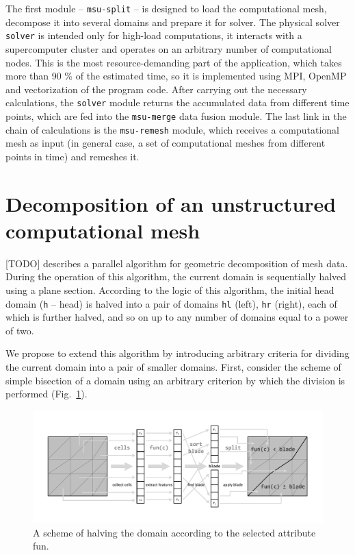 \documentclass[
11pt,%
tightenlines,%
twoside,%
onecolumn,%
nofloats,%
nobibnotes,%
nofootinbib,%
superscriptaddress,%
noshowpacs,%
centertags]%
{revtex4}
\begin{document}
The first module -- \texttt{msu-split} -- is designed to load the computational mesh, decompose it into several domains and prepare it for solver.
The physical solver \texttt{solver} is intended only for high-load computations, it interacts with a supercomputer cluster and operates on an arbitrary number of computational nodes.
This is the most resource-demanding part of the application, which takes more than 90 \% of the estimated time, so it is implemented using MPI, OpenMP and vectorization of the program code.
After carrying out the necessary calculations, the \texttt{solver} module returns the accumulated data from different time points, which are fed into the \texttt{msu-merge} data fusion module.
The last link in the chain of calculations is the \texttt{msu-remesh} module, which receives a computational mesh as input (in general case, a set of computational meshes from different points in time) and remeshes it.

\section{Decomposition of an unstructured computational mesh}

[TODO] describes a parallel algorithm for geometric decomposition of mesh data.
During the operation of this algorithm, the current domain is sequentially halved using a plane section.
According to the logic of this algorithm, the initial head domain (\texttt{h} -- head) is halved into a pair of domains \texttt{hl} (left), \texttt{hr} (right), each of which is further halved, and so on up to any number of domains equal to a power of two.

We propose to extend this algorithm by introducing arbitrary criteria for dividing the current domain into a pair of smaller domains.
First, consider the scheme of simple bisection of a domain using an arbitrary criterion by which the division is performed (Fig.~\ref{fig:03-split}).

\begin{figure}[h]
\includegraphics[width=1.0\textwidth]{pics/03-split.pdf}
\caption{A scheme of halving the domain according to the selected attribute fun.}\label{fig:03-split}
\end{figure}
\end{document}
